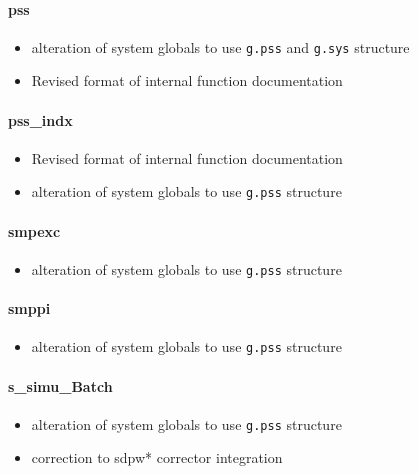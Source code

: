 \documentclass[12pt]{article}
\begin{document}
\paragraph{pss}
	\begin{itemize}
		\item alteration of system globals to use \verb|g.pss| and \verb|g.sys| structure
		\item Revised format of internal function documentation
	\end{itemize}
	
\paragraph{pss\_indx}
	\begin{itemize}
		\item Revised format of internal function documentation
		\item alteration of system globals to use \verb|g.pss| structure
	\end{itemize}
	
\paragraph{smpexc}
	\begin{itemize}
		\item alteration of system globals to use \verb|g.pss| structure
	\end{itemize}
	
\paragraph{smppi}
	\begin{itemize}
		\item alteration of system globals to use \verb|g.pss| structure
	\end{itemize}

\paragraph{s\_simu\_Batch}
	\begin{itemize}
		\item alteration of system globals to use \verb|g.pss| structure
		\item correction to sdpw* corrector integration
	\end{itemize}
\end{document}
